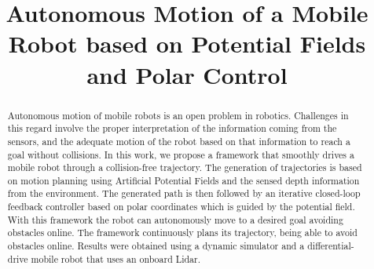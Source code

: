 \documentclass[conference]{IEEEtran}
\begin{document}
\title{Autonomous Motion of a Mobile Robot based on Potential Fields and Polar Control}
\author{
}

\IEEEoverridecommandlockouts
{}

\maketitle
\begin{abstract}
  Autonomous motion of mobile robots is an open problem in robotics. Challenges
  in this regard involve the proper interpretation of the information coming
  from the sensors, and the adequate motion of the robot based on that
  information to reach a goal without collisions.
  In this work, we propose a framework that smoothly drives a mobile robot
  through a collision-free trajectory. The generation of trajectories is based
  on motion planning using Artificial Potential Fields and the sensed depth
  information from the environment. The generated path is then followed by an
  iterative closed-loop feedback controller based on polar coordinates which is
  guided by the potential field. With this framework the robot can autonomously
  move to a desired goal avoiding obstacles online. The framework
  continuously plans its trajectory, being able to avoid obstacles
  online. Results were obtained using a dynamic simulator and a
  differential-drive mobile robot that uses an onboard Lidar.
\end{abstract}
\IEEEpeerreviewmaketitle
\end{document}
